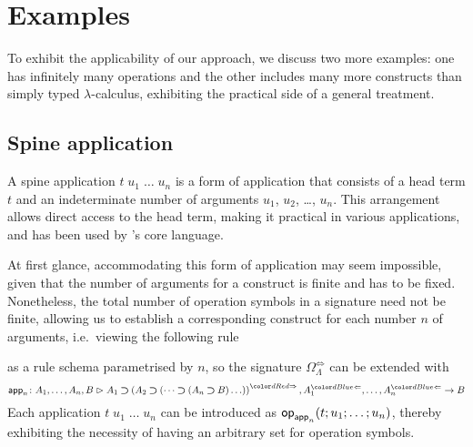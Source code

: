 
\section{Examples}\label{sec:example}
To exhibit the applicability of our approach, we discuss two more examples:
one has infinitely many operations and the other includes many more constructs than simply typed $\lambda$-calculus, exhibiting the practical side of a general treatment.

\subsection{Spine application}\label{subsec:spine}
A spine application $t\;u_1\;\ldots\;u_n$ is a form of application that consists of a head term $t$ and an indeterminate number of arguments $u_1$, $u_2$, \ldots, $u_n$.
This arrangement allows direct access to the head term, making it practical in various applications, and has been used by \Agda's core language. %

At first glance, accommodating this form of application may seem impossible, given that the number of arguments for a construct is finite and has to be fixed.
Nonetheless, the total number of operation symbols in a signature need not be finite, allowing us to establish a corresponding construct for each number $n$ of arguments, i.e.\ viewing the following rule
\bgroup
\small
  \begin{mathpar}
  \end{mathpar}
\egroup
as a rule schema parametrised by $n$, so the signature $\Omega_{\Lambda}^{\Leftrightarrow}$ can be extended with 
\[
  \aritysymbol{\mathsf{app}_n}{A_1,\ldots, A_n, B}{A_1 \bto \left(A_2 \bto \left(\dots \bto \left(A_n \bto B\right)\ldots\right)\right)^{\syn}, A_1^{\chk}, \ldots, A_n^{\chk}}{B}
\]
Each application $t\;u_1\;\ldots\;u_n$ can be introduced as $\tmOp_{\mathsf{app}_n}(t; u_1; \ldots; u_n)$, thereby exhibiting the necessity of having an arbitrary set for operation symbols.

